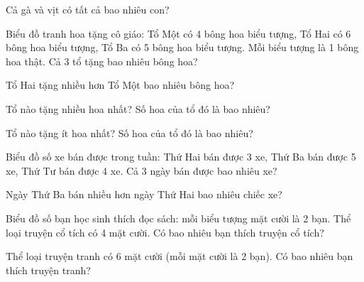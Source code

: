 \begin{ex}
Cả gà và vịt có tất cả bao nhiêu con?
\end{ex}

\begin{ex}
Biểu đồ tranh hoa tặng cô giáo: Tổ Một có 4 bông hoa biểu tượng, Tổ Hai có 6 bông hoa biểu tượng, Tổ Ba có 5 bông hoa biểu tượng. Mỗi biểu tượng là 1 bông hoa thật. Cả 3 tổ tặng bao nhiêu bông hoa?
\end{ex}

\begin{ex}
Tổ Hai tặng nhiều hơn Tổ Một bao nhiêu bông hoa?
\end{ex}

\begin{ex}
Tổ nào tặng nhiều hoa nhất? Số hoa của tổ đó là bao nhiêu?
\end{ex}

\begin{ex}
Tổ nào tặng ít hoa nhất? Số hoa của tổ đó là bao nhiêu?
\end{ex}

\begin{ex}
Biểu đồ số xe bán được trong tuần: Thứ Hai bán được 3 xe, Thứ Ba bán được 5 xe, Thứ Tư bán được 4 xe. Cả 3 ngày bán được bao nhiêu xe?
\end{ex}

\begin{ex}
Ngày Thứ Ba bán nhiều hơn ngày Thứ Hai bao nhiêu chiếc xe?
\end{ex}

\begin{ex}
Biểu đồ số bạn học sinh thích đọc sách: mỗi biểu tượng mặt cười là 2 bạn. Thể loại truyện cổ tích có 4 mặt cười. Có bao nhiêu bạn thích truyện cổ tích?
\end{ex}

\begin{ex}
Thể loại truyện tranh có 6 mặt cười (mỗi mặt cười là 2 bạn). Có bao nhiêu bạn thích truyện tranh?
\end{ex}

